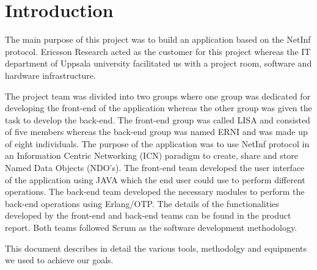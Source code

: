 \section{Introduction}
The main purpose of this project was to build an application based on the NetInf protocol. Ericsson Research acted as the customer for this project whereas the IT department of Uppsala university facilitated us with a project room, software and hardware infrastructure.

The project team was divided into two groups where one group was dedicated for developing the front-end of the application whereas the other group was given the task to develop the back-end. The front-end group was called LISA and consisted of five members whereas the back-end group was named ERNI and was made up of eight individuals. The purpose of the application was to use NetInf protocol in an Information Centric Networking (ICN) paradigm to create, share and store Named Data Objects (NDO's). The front-end team developed the user interface of the application using JAVA which the end user could use to perform different operations. The back-end team developed the necessary modules to perform the back-end operations using Erlang/OTP. The details of the functionalities developed by the front-end and back-end teams can be found in the product report. Both teams followed Scrum as the software development methodology.          

This document describes in detail the various tools, methodolgy and equipments we used to achieve our goals. 